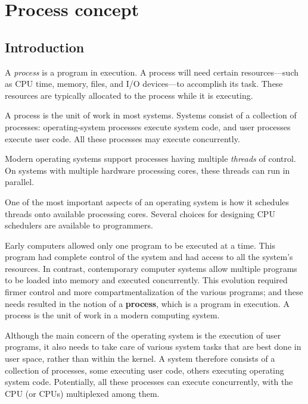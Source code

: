 \section{Process concept}\label{sec:3.1}

\subsection*{Introduction}\label{sec:3.1:introduction}
A \textit{process} is a program in execution. A process will need certain resources---such as CPU time, memory, files, and I/O devices---to accomplish its task. These resources are typically allocated to the process while it is executing.

A process is the unit of work in most systems. Systems consist of a collection of processes: operating-system processes execute system code, and user processes execute user code. All these processes may execute concurrently.

Modern operating systems support processes having multiple \textit{threads} of control. On systems with multiple hardware processing cores, these threads can run in parallel.

One of the most important aspects of an operating system is how it schedules threads onto available processing cores. Several choices for designing CPU schedulers are available to programmers.

Early computers allowed only one program to be executed at a time. This program had complete control of the system and had access to all the system's resources. In contrast, contemporary computer systems allow multiple programs to be loaded into memory and executed concurrently. This evolution required firmer control and more compartmentalization of the various programs; and these needs resulted in the notion of a \textbf{process}, which is a program in execution. A process is the unit of work in a modern computing system.

Although the main concern of the operating system is the execution of user programs, it also needs to take care of various system tasks that are best done in user space, rather than within the kernel. A system therefore consists of a collection of processes, some executing user code, others executing operating system code. Potentially, all these processes can execute concurrently, with the CPU (or CPUs) multiplexed among them.

